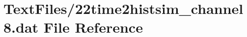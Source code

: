 \hypertarget{22time2histsim__channel8_8dat}{}\section{Text\+Files/22time2histsim\+\_\+channel8.dat File Reference}
\label{22time2histsim__channel8_8dat}
